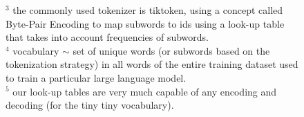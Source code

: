 \documentclass[12pt]{article}
\begin{document}
\begin{figure}[!htb]
    \hspace{25pt}
    \begin{minipage}[t]{.4\textwidth}
      \raggedright
      \scriptsize 
      $^3$ the commonly used tokenizer is tiktoken, using a concept called Byte-Pair Encoding to 
      map subwords to ids using a look-up table that takes into account frequencies of subwords.\\
      \vspace{2em}
      $^4$ vocabulary {\tiny $\sim$} set of unique words (or subwords based on the tokenization strategy) 
      in all words of the entire training dataset used to train a particular large language model.\\
      \vspace{2em}
      $^5$ our look-up tables are very much capable of any encoding and decoding (for the tiny tiny vocabulary).
    \end{minipage}
\end{figure}
\pagebreak
\end{document}
